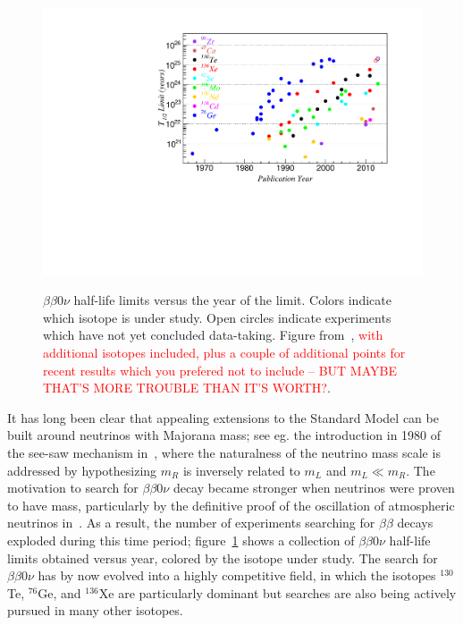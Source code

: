 \begin{figure}
\begin{center}
\includegraphics[keepaspectratio=true,width=\textwidth]{halflife_vs_year.pdf}
\end{center}
\renewcommand{\baselinestretch}{1}
\small\normalsize
\begin{quote}
\caption{$\beta\beta 0\nu$ half-life limits versus the year of the limit.  Colors indicate which isotope is under study.  Open circles indicate experiments which have not yet concluded data-taking.  Figure from~\cite{CarterReview2014}, \textcolor{red}{with additional isotopes included, plus a couple of additional points for recent results which you prefered not to include -- BUT MAYBE THAT'S MORE TROUBLE THAN IT'S WORTH?}.}
\label{fig:Halflife_vs_year}
\end{quote}
\end{figure}
\renewcommand{\baselinestretch}{2}
\small\normalsize

It has long been clear that appealing extensions to the Standard Model can be built around neutrinos with Majorana mass; see eg. the introduction in 1980 of the see-saw mechanism in~\cite{PhysRevLett.44.912}, where the naturalness of the neutrino mass scale is addressed by hypothesizing $m_R$ is inversely related to $m_L$ and $m_L \ll m_R$.  The motivation to search for $\beta\beta 0\nu$ decay became stronger when neutrinos were proven to have mass, particularly by the definitive proof of the oscillation of atmospheric neutrinos in~\cite{SuperK}.  As a result, the number of experiments searching for $\beta\beta$ decays exploded during this time period; figure~\ref{fig:Halflife_vs_year} shows a collection of $\beta\beta 0\nu$ half-life limits obtained versus year, colored by the isotope under study.  The search for $\beta\beta 0\nu$ has by now evolved into a highly competitive field, in which the isotopes $^{130}$Te, $^{76}$Ge, and $^{136}$Xe are particularly dominant but searches are also being actively pursued in many other isotopes.

